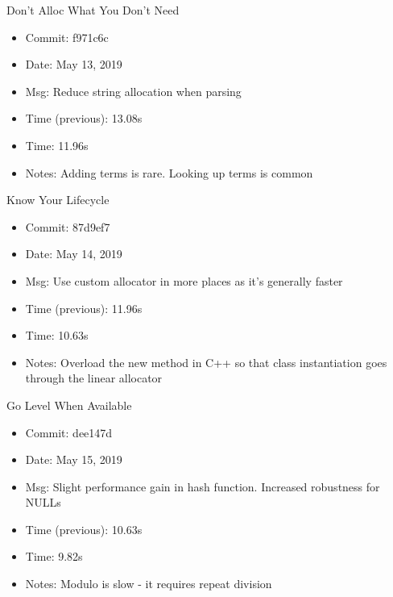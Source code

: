 \documentclass{beamer}
\begin{document}
\begin{frame}{Don't Alloc What You Don't Need}
	\begin{itemize}
	\item Commit: f971c6c
	\item Date: May 13, 2019
	\item Msg: Reduce string allocation when parsing
	\item Time (previous): 13.08s
	\item Time: 11.96s
	\item Notes: Adding terms is rare. Looking up terms is common
	\end{itemize}
	\makenode
\end{frame}

\begin{frame}{Know Your Lifecycle}
	\begin{itemize}
	\item Commit: 87d9ef7
	\item Date: May 14, 2019
	\item Msg: Use custom allocator in more places as it's generally faster
	\item Time (previous): 11.96s
	\item Time: 10.63s
	\item Notes: Overload the new method in C++ so that class instantiation goes through the linear allocator
	\end{itemize}
\end{frame}


\begin{frame}{Go Level When Available}
	\begin{itemize}
	\item Commit: dee147d
	\item Date: May 15, 2019
	\item Msg: Slight performance gain in hash function. Increased robustness for NULLs
	\item Time (previous): 10.63s
	\item Time: 9.82s
	\item Notes: Modulo is slow - it requires repeat division
	\end{itemize}
	\hashdiff
\end{frame}
\end{document}
